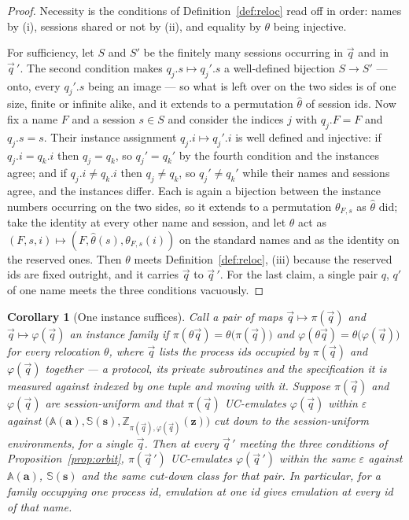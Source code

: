 \documentclass[11pt,a4paper]{article}
\newcommand{\bd}[1]{\mathbf{#1}}
\newcommand{\Aset}{\mathbb{A}}
\newcommand{\SimSet}{\mathbb{S}}
\newcommand{\ZenvSet}{\mathbb{Z}}
\theoremstyle{accentdef}
\theoremstyle{accentplain}
\newtheorem{corollary}[definition]{Corollary}
\begin{document}
\begin{proof}
Necessity is the conditions of Definition~\ref{def:reloc} read off in order: names by (i), sessions
shared or not by (ii), and equality by $\theta$ being injective.

For sufficiency, let $S$ and $S'$ be the finitely many sessions occurring in $\vec q$ and in
$\vec q\,'$. The second condition makes $q_j.s \mapsto q_j'.s$ a well-defined bijection $S \to S'$ ---
onto, every $q_j'.s$ being an image --- so what is left over on the two sides is of one size, finite or
infinite alike, and it extends to a permutation $\hat\theta$ of session ids. Now fix a name $F$
and a session $s \in S$ and consider the indices $j$ with $q_j.F = F$ and $q_j.s = s$. Their
instance assignment $q_j.i \mapsto q_j'.i$ is well defined and injective: if $q_j.i = q_k.i$ then
$q_j = q_k$, so $q_j' = q_k'$ by the fourth condition and the instances agree; and if
$q_j.i \neq q_k.i$ then $q_j \neq q_k$, so $q_j' \neq q_k'$ while their names and sessions agree, and
the instances differ. Each is again a bijection between the instance numbers occurring on the two
sides, so it extends to a permutation $\theta_{F,s}$ as $\hat\theta$ did; take the
identity at every other name and session, and let $\theta$ act as
$(F,s,i) \mapsto (F,\hat\theta(s),\theta_{F,s}(i))$ on the standard names and as the identity on the
reserved ones. Then $\theta$ meets Definition~\ref{def:reloc}, (iii) because the reserved ids are
fixed outright, and it carries $\vec q$ to $\vec q\,'$. For the last claim, a single pair $q$, $q'$ of
one name meets the three conditions vacuously.
\end{proof}

\begin{corollary}[One instance suffices]\label{cor:onepid}
Call a pair of maps $\vec q \mapsto \pi(\vec q)$ and $\vec q \mapsto \varphi(\vec q)$ an
\emph{instance family} if $\pi(\theta\vec q) = \theta\bigl(\pi(\vec q)\bigr)$ and
$\varphi(\theta\vec q) = \theta\bigl(\varphi(\vec q)\bigr)$ for every relocation $\theta$, where
$\vec q$ lists the process ids occupied by $\pi(\vec q)$ and $\varphi(\vec q)$ together --- a
protocol, its private subroutines and the specification it is measured against indexed by one tuple
and moving with it. Suppose $\pi(\vec q)$ and $\varphi(\vec q)$ are session-uniform and that
$\pi(\vec q)$ UC-emulates $\varphi(\vec q)$ within $\varepsilon$ against
$\bigl(\Aset(\bd{a}),\SimSet(\bd{s}),\ZenvSet_{\pi(\vec q),\varphi(\vec q)}(\bd{z})\bigr)$ cut down to
the session-uniform environments, for a single $\vec q$. Then at every $\vec q\,'$ meeting the three
conditions of Proposition~\ref{prop:orbit}, $\pi(\vec q\,')$ UC-emulates $\varphi(\vec q\,')$ within
the same $\varepsilon$ against $\Aset(\bd{a})$, $\SimSet(\bd{s})$ and the same cut-down class for that
pair. In particular, for a family occupying one process id, emulation at one id gives emulation at
every id of that name.
\end{corollary}
\end{document}
